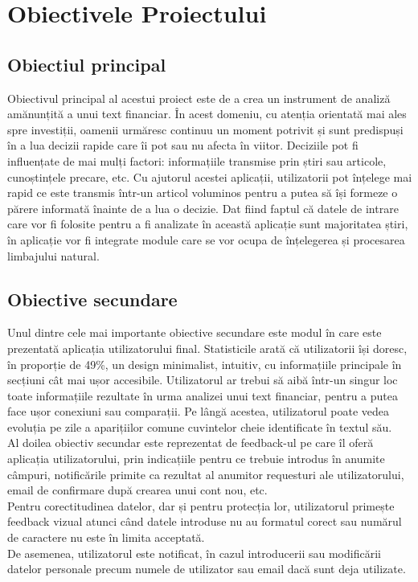 \chapter{Obiectivele Proiectului}\label{ch:obiective}
\pagestyle{fancy}

\section{Obiectiul principal}

Obiectivul principal al acestui proiect este de a crea un instrument de analiză amănunțită a unui text financiar. În acest domeniu, cu atenția orientată mai ales spre investiții,
oamenii urmăresc continuu un moment potrivit și sunt predispuși în a lua decizii rapide care îi pot sau nu afecta în viitor.
Deciziile pot fi influențate de mai mulți factori: informațiile transmise prin știri sau articole, cunoștințele precare, etc.
Cu ajutorul acestei aplicații, utilizatorii pot înțelege mai rapid ce este transmis într-un articol voluminos pentru a putea să își formeze o părere informată înainte de a lua o decizie.
Dat fiind faptul că datele de intrare care vor fi folosite pentru a fi analizate în această aplicație sunt majoritatea știri, în aplicație vor fi integrate module care se vor ocupa de înțelegerea și procesarea limbajului natural.



\section{Obiective secundare}
Unul dintre cele mai importante obiective secundare este modul în care este prezentată aplicația utilizatorului final.
Statisticile arată că utilizatorii își doresc, în proporție de 49\%, un design minimalist, intuitiv, cu informațiile principale în secțiuni cât mai ușor accesibile.
Utilizatorul ar trebui să aibă într-un singur loc toate informațiile rezultate în urma analizei unui text financiar, pentru a putea face ușor conexiuni sau comparații.
Pe lângă acestea, utilizatorul poate vedea evoluția pe zile a aparițiilor comune cuvintelor cheie identificate în textul său.\\

Al doilea obiectiv secundar este reprezentat de feedback-ul pe care îl oferă aplicația utilizatorului, prin indicațiile pentru ce trebuie introdus în anumite câmpuri,
notificările primite ca rezultat al anumitor requesturi ale utilizatorului, email de confirmare după crearea unui cont nou, etc.\\
Pentru corectitudinea datelor, dar și pentru protecția lor, utilizatorul primește feedback vizual atunci când datele introduse nu au formatul corect sau numărul de caractere nu este în limita acceptată.\\
De asemenea, utilizatorul este notificat, în cazul introducerii sau modificării datelor personale precum numele de utilizator sau email dacă sunt deja utilizate. \\

